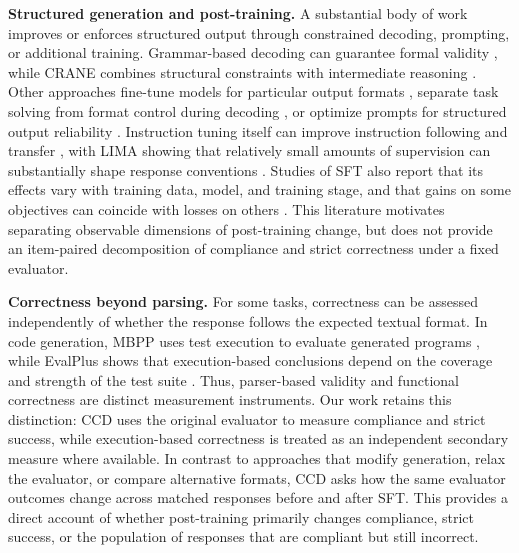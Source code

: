 \documentclass{article}
\begin{document}
\noindent\textbf{Structured generation and post-training.}
A substantial body of work improves or enforces structured output through
constrained decoding, prompting, or additional training. Grammar-based
decoding can guarantee formal validity \citep{geng-etal-2023-grammar}, while
CRANE combines structural constraints with intermediate reasoning
\citep{pmlr-v267-banerjee25a}. Other approaches fine-tune models for particular
output formats \citep{bunn-etal-2025-fine}, separate task solving from format
control during decoding \citep{deng-etal-2026-decoupling}, or optimize prompts
for structured output reliability \citep{galeone2026correct}. Instruction
tuning itself can improve instruction following and transfer
\citep{wei2022finetuned,sanh2022multitask,pmlr-v202-longpre23a}, with LIMA
showing that relatively small amounts of supervision can substantially shape
response conventions \citep{zhou2023lima}. Studies of SFT also report that its
effects vary with training data, model, and training stage, and that gains on
some objectives can coincide with losses on others
\citep{fu-etal-2024-disperse,harada-etal-2025-massive}. This literature
motivates separating observable dimensions of post-training change, but does
not provide an item-paired decomposition of compliance and strict correctness
under a fixed evaluator.

\noindent\textbf{Correctness beyond parsing.}
For some tasks, correctness can be assessed independently of whether the
response follows the expected textual format. In code generation, MBPP uses
test execution to evaluate generated programs \citep{austin2021program}, while
EvalPlus shows that execution-based conclusions depend on the coverage and
strength of the test suite \citep{liu2023evalplus}. Thus, parser-based validity
and functional correctness are distinct measurement instruments. Our work
retains this distinction: CCD uses the original evaluator to measure
compliance and strict success, while execution-based correctness is treated as
an independent secondary measure where available. In contrast to approaches
that modify generation, relax the evaluator, or compare alternative formats,
CCD asks how the same evaluator outcomes change across matched responses
before and after SFT. This provides a direct account of whether post-training
primarily changes compliance, strict success, or the population of responses
that are compliant but still incorrect.
\end{document}
